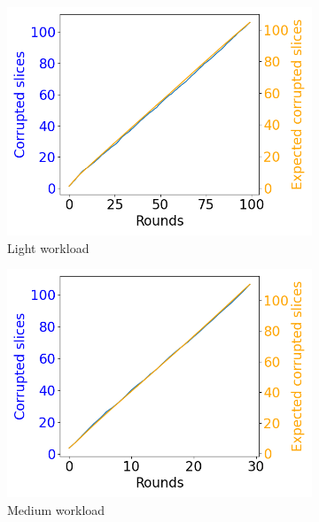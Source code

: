 \documentclass[a4paper,11pt,oneside]{report}
\begin{document}
\begin{figure}[ht]
     \centering
     \begin{subfigure}[b]{0.3\textwidth}
         \centering
         \includegraphics[width=\textwidth]{Figures/corruption_rate300KB.png}
         \caption{Light workload}
         \label{fig:slice_light}
     \end{subfigure}
     \hfill
     \begin{subfigure}[b]{0.3\textwidth}
         \centering
         \includegraphics[width=\textwidth]{Figures/corruption_rate1MB.png}
         \caption{Medium workload}
         \label{fig:slice_medium}
     \end{subfigure}
     \hfill
     \begin{subfigure}[b]{0.3\textwidth}

\end{subfigure}
\end{figure}
\end{document}
